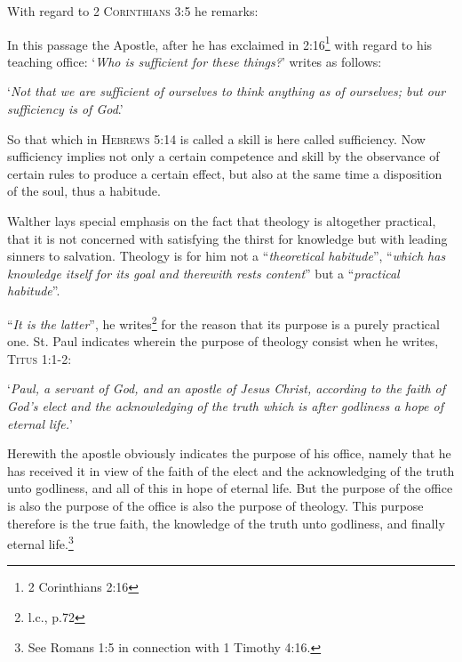 With regard to {\scriptsize\textsc{2 Corinthians 3:5}} he remarks:  \begin{fancyquotes}In this passage the Apostle, after he has exclaimed in 2:16\footnote{2 Corinthians 2:16} with regard to his teaching office:  ‘\textit{Who is sufficient for these things?}’  writes as follows: \begin{displayquote} ‘\textit{Not that we are sufficient of ourselves to think anything as of ourselves; but our sufficiency is of God}.’\end{displayquote}  So that which in {\scriptsize\textsc{Hebrews 5:14}} is called a skill  is here called sufficiency.  Now sufficiency implies not only a certain competence and skill by the observance of certain rules to produce a certain effect, but also at the same time a disposition of the soul, thus a habitude.\end{fancyquotes}
 Walther lays special emphasis on the fact that theology is altogether practical, that it is not concerned with satisfying the thirst for knowledge but with leading sinners to salvation.  Theology is for him not a “\textit{theoretical habitude}”, “\textit{which has knowledge itself for its goal and therewith rests content}” but a “\textit{practical habitude}”.


“\textit{It is the latter}”, he writes\footnote{l.c., p.72} for the reason that its purpose is a purely practical one.  St. Paul indicates wherein the purpose of theology consist when he writes, {\scriptsize\textsc{Titus 1:1-2}}: \begin{displayquote}‘\textit{Paul, a servant of God, and an apostle of Jesus Christ, according to the faith of God’s elect and the acknowledging of the truth which is after godliness a hope of eternal life.}’ \end{displayquote} Herewith the apostle obviously indicates the purpose of his office, namely that he has received it in view of the faith of the elect and the acknowledging of the truth unto godliness, and all of this in hope of eternal life.  But the purpose of the office is also the purpose of the office is also the purpose of theology.  This purpose therefore is the true faith, the knowledge of the truth unto godliness, and finally eternal life.\footnote{See Romans 1:5 in connection with 1 Timothy 4:16.}


